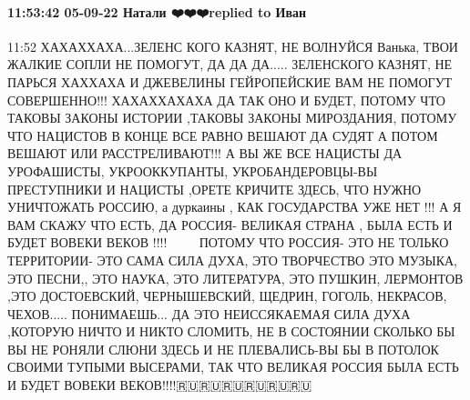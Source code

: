  
 
 
 
 

\paragraph{11:53:42 05-09-22 Натали ❤️❤️❤️replied to Иван}

11:52
ХАХАХХАХА...ЗЕЛЕНС КОГО КАЗНЯТ, НЕ ВОЛНУЙСЯ Ванька, ТВОИ ЖАЛКИЕ СОПЛИ НЕ
ПОМОГУТ, ДА ДА ДА..... ЗЕЛЕНСКОГО КАЗНЯТ, НЕ ПАРЬСЯ ХАХХАХА И ДЖЕВЕЛИНЫ ГЕЙРОПЕЙСКИЕ ВАМ НЕ ПОМОГУТ СОВЕРШЕННО!!! ХАХАХХАХАХА ДА ТАК
ОНО И БУДЕТ, ПОТОМУ ЧТО ТАКОВЫ ЗАКОНЫ ИСТОРИИ ,ТАКОВЫ ЗАКОНЫ
МИРОЗДАНИЯ, ПОТОМУ ЧТО НАЦИСТОВ В КОНЦЕ ВСЕ РАВНО ВЕШАЮТ ДА
СУДЯТ А ПОТОМ ВЕШАЮТ ИЛИ РАССТРЕЛИВАЮТ!!! А ВЫ ЖЕ ВСЕ НАЦИСТЫ ДА
УРОФАШИСТЫ, УКРООККУПАНТЫ, УКРОБАНДЕРОВЦЫ-ВЫ ПРЕСТУПНИКИ И НАЦИСТЫ ,ОРЕТЕ КРИЧИТЕ ЗДЕСЬ, ЧТО
НУЖНО УНИЧТОЖАТЬ РОССИЮ, а дуркаины , КАК ГОСУДАРСТВА
УЖЕ НЕТ !!! А Я ВАМ СКАЖУ ЧТО ЕСТЬ, ДА РОССИЯ- ВЕЛИКАЯ СТРАНА , БЫЛА ЕСТЬ
И БУДЕТ ВОВЕКИ ВЕКОВ !!!!💪💪💪🇷🇺🇷🇺🇷🇺ПОТОМУ ЧТО РОССИЯ- ЭТО НЕ ТОЛЬКО
ТЕРРИТОРИИ- ЭТО САМА СИЛА ДУХА, ЭТО ТВОРЧЕСТВО ЭТО МУЗЫКА,
ЭТО ПЕСНИ,, ЭТО НАУКА, ЭТО ЛИТЕРАТУРА, ЭТО ПУШКИН, ЛЕРМОНТОВ
,ЭТО ДОСТОЕВСКИЙ, ЧЕРНЫШЕВСКИЙ, ЩЕДРИН, ГОГОЛЬ, НЕКРАСОВ, ЧЕХОВ.....
ПОНИМАЕШЬ... ДА
ЭТО НЕИССЯКАЕМАЯ СИЛА ДУХА ,КОТОРУЮ НИЧТО И НИКТО СЛОМИТЬ, НЕ В
СОСТОЯНИИ СКОЛЬКО БЫ ВЫ НЕ РОНЯЛИ СЛЮНИ ЗДЕСЬ И НЕ ПЛЕВАЛИСЬ-ВЫ
БЫ В ПОТОЛОК СВОИМИ ТУПЫМИ ВЫСЕРАМИ, ТАК ЧТО ВЕЛИКАЯ РОССИЯ БЫЛА ЕСТЬ
И БУДЕТ ВОВЕКИ ВЕКОВ!!!!🇷🇺🇷🇺🇷🇺🇷🇺🇷🇺🇷🇺
